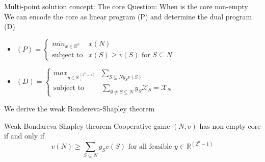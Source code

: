 \documentclass{beamer}
\newcommand{\R}{\mathbb{R}}
\begin{document}
\begin{frame}{Multi-point solution concept: The core}
    Question: When is the core non-empty \\
	We can encode the core as linear program (P) and determine the dual program (D)
    \begin{itemize}
		\item $\left(P\right)=\begin{cases}
			min_{x \in \R^n} & x \left(N\right) \\
			\text{subject to} &x\left(S\right) \geq v\left(S\right)\text{ for }S \subseteq N
		\end{cases}$
		\item $\left(D\right)=\begin{cases}
			max_{y \in \R_{+}^{\left(2^n-1\right)}} & \sum_{S \subseteq N y_S v\left(S\right)} \\
			\text{subject to} & \sum_{\emptyset \neq S \subseteq N} y_S \mathcal{X}_S = \mathcal{X}_N
		\end{cases}$
	\end{itemize}
	We derive the weak Bondereva-Shapley theorem
	\begin{block}{Weak Bondareva-Shapley theorem}
		Cooperative game $\left(N,v\right)$ has non-empty core if and only if 
		\[
			v\left(N\right) \geq \sum_{S \subseteq N} y_S v\left(S\right)\text{ for all feasible }y \in \R^{\left(2^n-1\right)}
		\]
	\end{block}
\end{frame}


\end{document}

